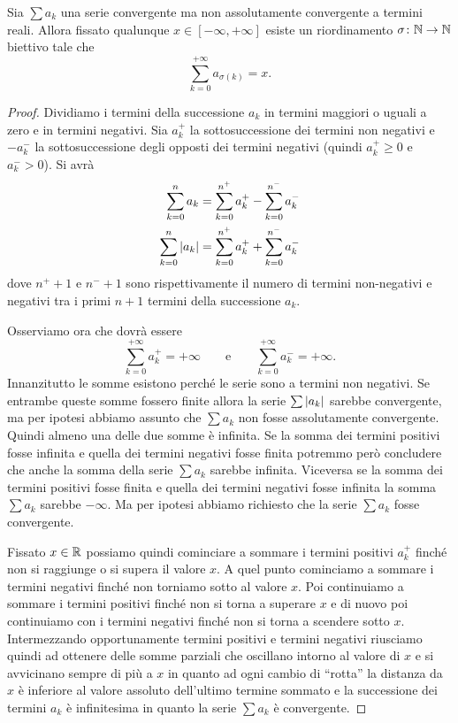 \begin{theorem}%
\label{th:convergenza_condizionata}%
%
%
Sia $\sum a_k$ una serie convergente ma non assolutamente convergente a termini reali.
Allora fissato qualunque $x \in [-\infty , +\infty]$ esiste un riordinamento
$\sigma \colon {\mathbb N} \to {\mathbb N}$ biettivo tale che
\[
  \sum_{k=0}^{+\infty}  a_{\sigma(k)} = x.
\]
\end{theorem}
%
\begin{proof}
Dividiamo i termini della successione $a_k$ in termini maggiori o uguali a zero
e in termini negativi. Sia $a^+_k$ la sottosuccessione dei termini non negativi
e $-a^-_k$ la sottosuccessione degli opposti
dei termini negativi (quindi $a^+_k\ge 0$ e $a^-_k > 0$). Si avrà
\begin{align*}
  \sum_{k=0}^n a_k &= \sum_{k=0}^{n^+} a^+_k - \sum_{k=0}^{n^-} a^-_k \\
  \sum_{k=0}^n {\left|a_k\right|} &= \sum_{k=0}^{n^+} a^+_k + \sum_{k=0}^{n^-} a^-_k
\end{align*}
dove $n^+ +1$ e $n^-+1$ sono rispettivamente
il numero di termini non-negativi e negativi
tra i primi $n+1$ termini della successione $a_k$.

Osserviamo ora che dovrà essere
\[
\sum_{k=0}^{+\infty} a_k^+ = +\infty \qquad \text{e} \qquad
\sum_{k=0}^{+\infty} a_k^- = +\infty.
\]
Innanzitutto le somme esistono perché le serie sono a termini non negativi.
Se entrambe queste somme fossero finite allora la serie $\sum{\left|a_k\right|}$ sarebbe convergente, ma per ipotesi abbiamo assunto che $\sum a_k$ non fosse
assolutamente convergente.
Quindi almeno una delle due somme è infinita. Se la somma dei termini positivi
fosse infinita e quella dei termini negativi fosse finita potremmo però
concludere che anche la somma della serie $\sum a_k$ sarebbe infinita.
Viceversa se la somma dei termini positivi fosse finita e quella dei termini
negativi fosse infinita la somma $\sum a_k$ sarebbe $-\infty$. Ma per ipotesi
abbiamo richiesto che la serie $\sum a_k$ fosse convergente.

Fissato $x\in {\mathbb R}$ possiamo quindi cominciare a sommare i termini positivi
$a^+_k$ finché non si raggiunge o si supera il valore $x$. A quel punto cominciamo a sommare i termini negativi finché non torniamo sotto al valore $x$.
Poi continuiamo a sommare i termini positivi finché non si torna a superare $x$
e di nuovo poi continuiamo con i termini negativi finché non si torna a scendere
sotto $x$. Intermezzando opportunamente termini positivi e termini negativi
riusciamo quindi ad ottenere delle somme parziali che oscillano intorno al valore 
di $x$ e si avvicinano sempre di più a $x$ in quanto ad ogni cambio di ``rotta'' 
la distanza da $x$ è inferiore al valore assoluto dell'ultimo termine sommato 
e la successione dei termini $a_k$ è infinitesima in quanto la serie $\sum a_k$ è convergente.


\end{proof}
